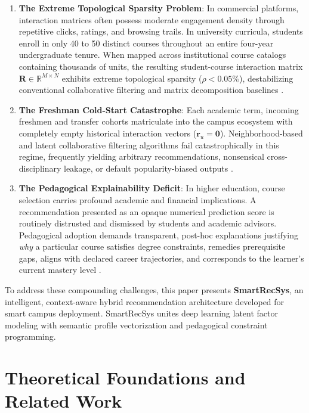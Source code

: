 \documentclass[conference,letterpaper]{IEEEtran}
\begin{document}
\begin{enumerate}
    \item \textbf{The Extreme Topological Sparsity Problem}: In commercial platforms, interaction matrices often possess moderate engagement density through repetitive clicks, ratings, and browsing trails. In university curricula, students enroll in only 40 to 50 distinct courses throughout an entire four-year undergraduate tenure. When mapped across institutional course catalogs containing thousands of units, the resulting student-course interaction matrix $\mathbf{R} \in \mathbb{R}^{M \times N}$ exhibits extreme topological sparsity ($\rho < 0.05\%$), destabilizing conventional collaborative filtering and matrix decomposition baselines \cite{shi2014, liu2021matthew}.
    \item \textbf{The Freshman Cold-Start Catastrophe}: Each academic term, incoming freshmen and transfer cohorts matriculate into the campus ecosystem with completely empty historical interaction vectors ($\mathbf{r}_u = \mathbf{0}$). Neighborhood-based and latent collaborative filtering algorithms fail catastrophically in this regime, frequently yielding arbitrary recommendations, nonsensical cross-disciplinary leakage, or default popularity-biased outputs \cite{lika2014, kluver2014}.
    \item \textbf{The Pedagogical Explainability Deficit}: In higher education, course selection carries profound academic and financial implications. A recommendation presented as an opaque numerical prediction score is routinely distrusted and dismissed by students and academic advisors. Pedagogical adoption demands transparent, post-hoc explanations justifying \textit{why} a particular course satisfies degree constraints, remedies prerequisite gaps, aligns with declared career trajectories, and corresponds to the learner's current mastery level \cite{bodria2023xai, jannach2016}.
\end{enumerate}

To address these compounding challenges, this paper presents \textbf{SmartRecSys}, an intelligent, context-aware hybrid recommendation architecture developed for smart campus deployment. SmartRecSys unites deep learning latent factor modeling with semantic profile vectorization and pedagogical constraint programming.

\section{Theoretical Foundations and Related Work}
\end{document}
